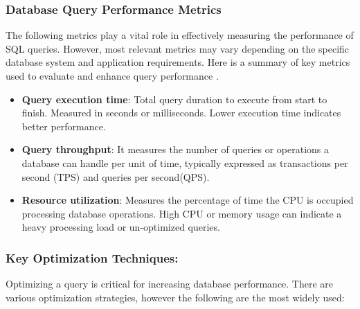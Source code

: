 \subsubsection{Database Query Performance Metrics}
The following metrics play a vital role in effectively measuring the performance of SQL queries. However, most relevant metrics may vary depending on the specific database system and application requirements.
Here is a summary of key metrics used to evaluate and enhance query performance \cite{chwesewicz-2024}.
\begin{itemize}
    \item\textbf{Query execution time}: Total query duration to execute from start to finish. Measured in seconds or milliseconds. Lower execution time indicates better performance.
    \item\textbf{Query throughput}: It measures the number of queries or operations a database can handle per unit of time, typically expressed as transactions per second (TPS) and queries per second(QPS).
    \item\textbf{Resource utilization}: Measures the percentage of time the CPU is occupied processing database operations. High CPU or memory usage can indicate a heavy processing load or un-optimized queries.
\end{itemize}

\subsubsection{Key Optimization Techniques:}

Optimizing a query is critical for increasing database performance. There are various optimization strategies, however the following are the most widely used:

